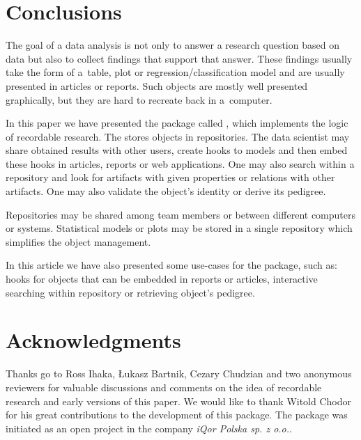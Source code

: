 \documentclass[nojss]{jss}\usepackage[]{graphicx}\usepackage[]{color}
\begin{document}
\section{Conclusions}
\label{sec:conc4}

The goal of a data analysis is not only to answer a research question based on data but also to collect findings that support that answer. These findings usually take the form of a~table, plot or regression/classification model and are usually presented in articles or reports. Such objects are mostly well presented graphically, but they are hard to recreate back in a~computer.

In this paper we have presented the  package called , which implements the logic of recordable research. The  stores  objects in repositories. The data scientist may share obtained results with other users, create hooks to models and then embed these hooks in articles, reports or web applications. One may also search within a repository and look for artifacts with given properties or relations with other artifacts. One may also validate the object’s identity or derive its pedigree.

Repositories may be shared among team members or between different computers or systems. Statistical models or plots may be stored in a single repository which simplifies the object management.

In this article we have also presented some use-cases for the  package, such as: hooks for  objects that can be embedded in reports or articles, interactive searching within repository or retrieving object’s pedigree. 


\section{Acknowledgments}

Thanks go to Ross Ihaka, \L{}ukasz Bartnik, Cezary Chudzian and two anonymous reviewers for valuable discussions and comments on the idea of recordable research and early versions of this paper. We would like to thank Witold Chodor for his great contributions to the development of this package. The package  was initiated as an open project in the company \textit{iQor Polska sp. z o.o.}.




\end{document}

